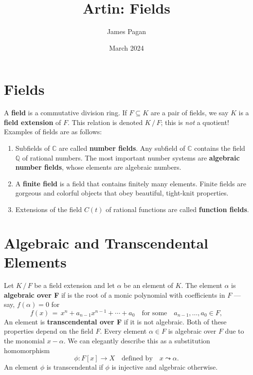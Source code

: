 \documentclass[11pt]{article}
\title{Artin: Fields}
\author{James Pagan}
\date{March 2024}
\begin{document}
\maketitle
\tableofcontents
\newpage


\section{Fields}

A \textbf{field} is a commutative division ring. If $F \subseteq K$ are a pair of fields, we say $K$ is a \textbf{field extension} of $F$. This relation is denoted $K \, / \, F$; this is \textit{not} a quotient! Examples of fields are as follows:
\begin{enumerate}
  \item Subfields of $\mathbb{C}$ are called \textbf{number fields}. Any subfield of $\mathbb{C}$ contains the field $\mathbb{Q}$ of rational numbers. The most important number systems are \textbf{algebraic number fields}, whose elements are algebraic numbers.
  \item A \textbf{finite field} is a field that contains finitely many elements. Finite fields are gorgeous and colorful objects that obey beautiful, tight-knit properties.
  \item Extensions of the field $C(t)$ of rational functions are called \textbf{function fields}.
\end{enumerate}


\section{Algebraic and Transcendental Elements}

Let $K \, / \, F$ be a field extension and let $\alpha$ be an element of $K$. The element $\alpha$ is \textbf{algebraic over F} if is the root of a monic polynomial with coefficients in $F$ --- say, $f(\alpha) = 0$ for
\[
  f(x) \, = \, x^{n} + a_{n - 1}x^{n - 1} + \cdots + a_{0} \quad \text{for some} \quad a_{n - 1}, \ldots, a_{0} \in F,
\]
An element is \textbf{transcendental over F} if it is not algebraic. Both of these properties depend on the field $F$. Every element $\alpha \in F$ is algebraic over $F$ due to the monomial $x - \alpha$. We can elegantly describe this as a substitution homomorphism
\[
  \phi : F[x] \to X \quad \text{defined by} \quad x \leadsto \alpha.
\]
An element $\phi$ is transcendental if $\phi$ is injective and algebraic otherwise.
\end{document}
